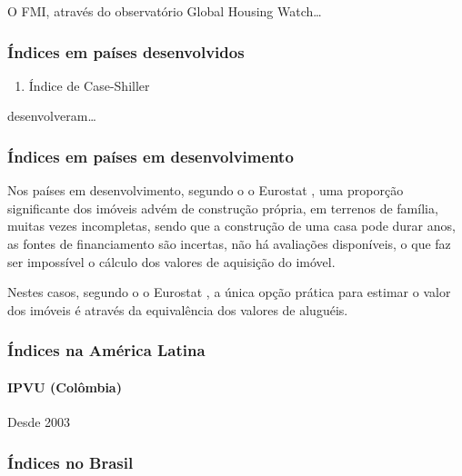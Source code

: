 \documentclass[
	12pt,				%
	oneside,			%
	a4paper,			%
	chapter=TITLE,		%
	section=TITLE,		%
	english,			%
	brazil				%
	]{abntex2}
\begin{document}
O FMI, através do observatório Global Housing Watch\ldots{}

\hypertarget{uxedndices-em-pauxedses-desenvolvidos}{%
\subsubsection{Índices em países desenvolvidos}\label{uxedndices-em-pauxedses-desenvolvidos}}
\begin{enumerate}
\def\labelenumi{\alph{enumi}.}
\tightlist
\item
  Índice de Case-Shiller
\end{enumerate}
\textcite{NBERw2506} desenvolveram\ldots{}

\hypertarget{uxedndices-em-pauxedses-em-desenvolvimento}{%
\subsubsection{Índices em países em desenvolvimento}\label{uxedndices-em-pauxedses-em-desenvolvimento}}

Nos países em desenvolvimento, segundo o o Eurostat \autocite*[110]{rppi}, uma proporção
significante dos imóveis advém de construção própria, em terrenos de família,
muitas vezes incompletas, sendo que a construção de uma casa pode durar anos, as
fontes de financiamento são incertas, não há avaliações disponíveis, o que faz
ser impossível o cálculo dos valores de aquisição do imóvel.

Nestes casos, segundo o o Eurostat \autocite*[110]{rppi}, a única opção prática para
estimar o valor dos imóveis é através da equivalência dos valores de aluguéis.

\hypertarget{uxedndices-na-amuxe9rica-latina}{%
\subsubsection{Índices na América Latina}\label{uxedndices-na-amuxe9rica-latina}}

\hypertarget{ipvu-coluxf4mbia}{%
\paragraph{IPVU (Colômbia)}\label{ipvu-coluxf4mbia}}

Desde 2003 \autocite[130]{rppi}

\hypertarget{uxedndices-no-brasil}{%
\subsubsection{Índices no Brasil}\label{uxedndices-no-brasil}}
\end{document}
